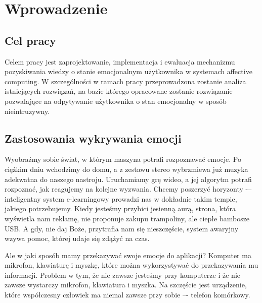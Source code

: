 \chapter{Wprowadzenie}
\label{cha:wprowadzenie}


\section{Cel pracy}
\label{sec:celPracy}

Celem pracy jest zaprojektowanie, implementacja i ewaluacja mechanizmu pozyskiwania wiedzy o stanie emocjonalnym użytkownika w systemach affective computing. W szczególności w ramach pracy przeprowadzona zostanie analiza istniejących rozwiązań, na bazie którego opracowane zostanie rozwiązanie pozwalające na odpytywanie użytkownika o stan emocjonalny w sposób nieintruzywny.


\section{Zastosowania wykrywania emocji}
\label{sec:zastosowaniaWykrywaniaEmocji}

Wyobraźmy sobie świat, w którym maszyna potrafi rozpoznawać emocje. Po ciężkim dniu wchodzimy do domu, a z zestawu stereo wybrzmiewa już muzyka adekwatna do naszego nastroju. Uruchamiamy grę wideo, a jej algorytm potrafi rozpoznać, jak reagujemy na kolejne wyzwania. Chcemy poszerzyć horyzonty -– inteligentny system e-learningowy prowadzi nas w dokładnie takim tempie, jakiego potrzebujemy. Kiedy jesteśmy przybici jesienną aurą, strona, która wyświetla nam reklamę, nie proponuje zakupu trampoliny, ale ciepłe bambosze USB. A gdy, nie daj Boże, przytrafia nam się nieszczęście, system awaryjny wzywa pomoc, której udaje się zdążyć na czas.

Ale w jaki sposób mamy przekazywać swoje emocje do aplikacji? Komputer ma mikrofon, klawiaturę i myszkę, które można wykorzystywać do przekazywania mu informacji. Problem w tym, że nie zawsze jesteśmy przy komputerze i że nie zawsze wystarczy mikrofon, klawiatura i myszka. Na szczęście jest urządzenie, które współczesny człowiek ma niemal zawsze przy sobie –- telefon komórkowy.



